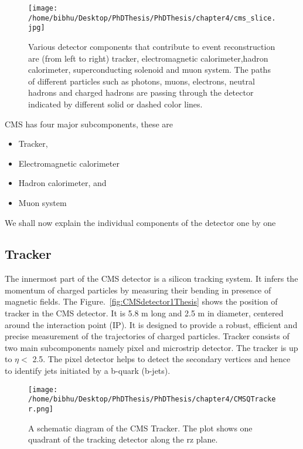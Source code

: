\begin{figure}[h]
    \centering  
    \texttt{[image: /home/bibhu/Desktop/PhDThesis/PhDThesis/chapter4/cms\_slice.jpg]}
    \caption{ \small Various detector components that contribute to event reconstruction are (from left to right) tracker, electromagnetic calorimeter,hadron calorimeter, superconducting solenoid and muon system. The paths of different particles  such as photons, muons, electrons, neutral hadrons and charged hadrons are passing through the detector indicated by different solid or dashed color lines.}
    \label{fig:CMSdetector2}
\end{figure}
CMS has four major subcomponents, these are 

\begin{itemize}

\item Tracker,
\vspace{0.1cm} 
\item Electromagnetic calorimeter
\vspace{0.1cm} 
\item Hadron calorimeter, and 
\vspace{0.1cm} 
\item Muon system


\end{itemize}

We shall now explain the individual components of the detector one by one 


\subsection{Tracker}

The innermost part of the CMS detector is a silicon tracking system. It infers the momentum of charged particles by measuring their bending in presence of magnetic fields. The Figure.~\ref{fig:CMSdetector1Thesis} shows the position of tracker in the CMS detector. It is 5.8 m long and 2.5 m in diameter, centered around the interaction point (IP). It is designed to provide a robust, efficient and precise measurement of the  trajectories of charged particles. Tracker consists of  two main subcomponents namely pixel and microstrip detector. The tracker is up to $\eta < $ 2.5.  The pixel detector helps to detect the secondary vertices and hence to identify jets initiated by a b-quark (b-jets). 



\begin{figure}[h]
    \centering  
    \texttt{[image: /home/bibhu/Desktop/PhDThesis/PhDThesis/chapter4/CMSQTracker.png]}
    \caption{ \small A schematic diagram of the CMS Tracker. The plot shows one quadrant of the tracking detector along the rz plane.}
    \label{fig:CMSQTracker1}
\end{figure}



